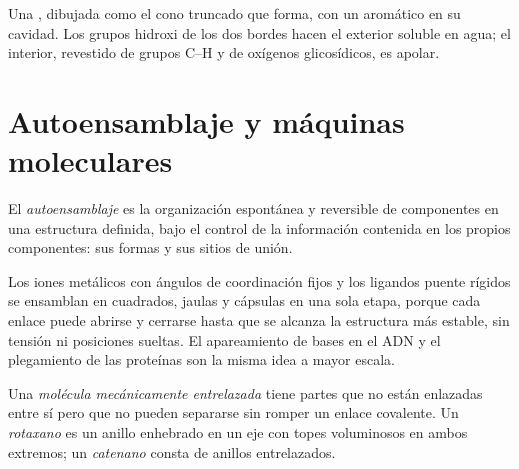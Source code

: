 \begin{omfigure}

{\small Una , dibujada como el cono truncado que forma, con un
 aromático en su cavidad. Los grupos hidroxi de los dos bordes hacen el exterior
soluble en agua; el interior, revestido de grupos C--H y de oxígenos glicosídicos, es
apolar.}
\end{omfigure}

\section{Autoensamblaje y máquinas moleculares}

\begin{definition}[Autoensamblaje]\label{def:b3:supramolecular:self-assembly}
El \emph{autoensamblaje} es la organización espontánea y reversible
de componentes en una estructura definida, bajo el control de la
información contenida en los propios componentes: sus formas y sus sitios
de unión.
\end{definition}

Los iones metálicos con ángulos de coordinación fijos y los ligandos puente rígidos se ensamblan
en cuadrados, jaulas y cápsulas en una sola etapa, porque cada enlace puede abrirse
y cerrarse hasta que se alcanza la estructura más estable, sin tensión ni posiciones
sueltas. El apareamiento de bases en el ADN y el plegamiento de las proteínas son la misma idea
a mayor escala.

\begin{definition}\label{def:b3:supramolecular:interlocked}
Una \emph{molécula mecánicamente entrelazada}
tiene partes que no están enlazadas entre sí pero que no pueden separarse
sin romper un enlace covalente. Un \emph{rotaxano} es un anillo
enhebrado en un eje con topes voluminosos en ambos extremos; un
\emph{catenano} consta de anillos entrelazados.
\end{definition}

